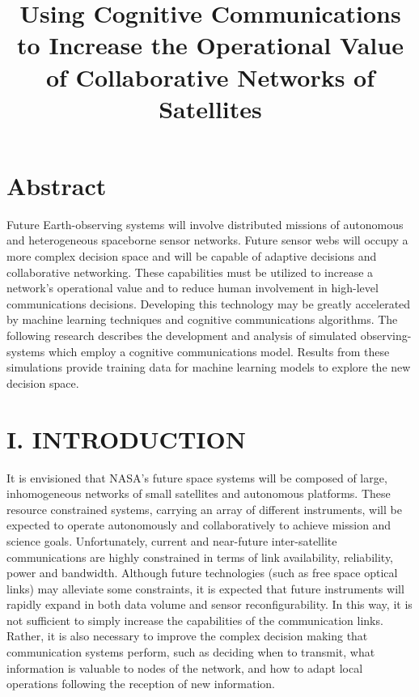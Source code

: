 \documentclass[11pt]{article}
\date{}
\title{Using Cognitive Communications to Increase the Operational Value of Collaborative Networks of Satellites}
\begin{document}
\maketitle
\section*{Abstract}
\label{sec:org7ab0300}

Future Earth-observing systems will involve distributed missions of autonomous
and heterogeneous spaceborne sensor networks.  Future sensor webs will occupy a
more complex decision space and will be capable of adaptive decisions and
collaborative networking.  These capabilities must be utilized to increase a
network's operational value and to reduce human involvement in high-level
communications decisions.  Developing this technology may be greatly accelerated
by machine learning techniques and cognitive communications algorithms.  The
following research describes the development and analysis of simulated
observing-systems which employ a cognitive communications model.  Results from
these simulations provide training data for machine learning models to explore
the new decision space.

\section*{I. INTRODUCTION}
\label{sec:orgdd8b396}

It is envisioned that NASA's future space systems will be composed of large,
inhomogeneous networks of small satellites and autonomous platforms.  These
resource constrained systems, carrying an array of different instruments, will
be expected to operate autonomously and collaboratively to achieve mission and
science goals.  Unfortunately, current and near-future inter-satellite
communications are highly constrained in terms of link availability,
reliability, power and bandwidth.  Although future technologies (such as free
space optical links) may alleviate some constraints, it is expected that future
instruments will rapidly expand in both data volume and sensor
reconfigurability.  In this way, it is not sufficient to simply increase the
capabilities of the communication links.  Rather, it is also necessary to
improve the complex decision making that communication systems perform, such as
deciding when to transmit, what information is valuable to nodes of the network,
and how to adapt local operations following the reception of new information.
\end{document}
